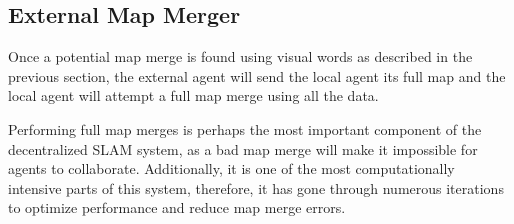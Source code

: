 \subsection{External Map Merger}
\label{sec:external-map-merger}
Once a potential map merge is found using visual words as described in the previous section, the external agent will send the local agent its full map and the local agent will attempt a full map merge using all the data.

Performing full map merges is perhaps the most important component of the decentralized SLAM system, as a bad map merge will make it impossible for agents to collaborate. Additionally, it is one of the most computationally intensive parts of this system, therefore, it has gone through numerous iterations to optimize performance and reduce map merge errors.



